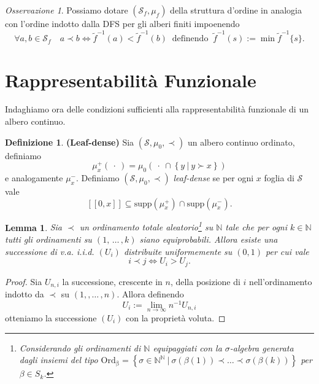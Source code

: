\documentclass[11pt, twoside]{report}
\newcommand{\Ss}{\mathscr{S}}
\theoremstyle{definition}
\newtheorem{definizione}{Definizione}[chapter]
\theoremstyle{plain}
\newtheorem{lemma}[teo]{Lemma}
\theoremstyle{remark}
\newtheorem{oss}{Osservazione}[chapter]
\numberwithin{equation}{chapter}
\begin{document}
\begin{oss}
Possiamo dotare $(\Ss_f, \mu_f)$ della struttura d'ordine in analogia con l'ordine indotto dalla DFS per gli alberi finiti impoenendo 
$$\forall a,b\in \Ss_f \quad a\prec b \iff \tilde{f}^{-1}(a)<\tilde{f}^{-1}(b) \ \text{ definendo } \ \tilde{f}^{-1}(s):=\min \tilde{f}^{-1}\{s\}.$$
\end{oss}

\section{Rappresentabilità Funzionale}

Indaghiamo ora delle condizioni sufficienti alla rappresentabilità funzionale di un albero continuo.

\begin{definizione}{\textbf{(Leaf-dense)}}
Sia $(\Ss, \mu_0, \prec)$ un albero continuo ordinato, definiamo
$$\mu_x^+(\ \cdot\ )=\mu_0\left(\ \cdot \ \cap \left\{y \ | \ y\succ x\right\}\right)$$
e analogamente $\mu_x^-$. Definiamo $(\Ss, \mu_0, \prec)$ \textit{leaf-dense} se per ogni $x$ foglia di $\Ss$ vale
$$[[0,x]] \subseteq \mathrm{supp}\left(\mu_x^+\right) \cap \mathrm{supp} \left(\mu_x^-\right).$$
\end{definizione}

\begin{lemma}\label{lemma_order}
Sia $\prec$ un ordinamento totale aleatorio\footnote{Considerando gli ordinamenti di $\mathbb{N}$ equipaggiati con la $\sigma$-algebra generata dagli insiemi del tipo ${\mathrm{Ord_{\beta}}=\left\{ \sigma \in \mathbb{N}^{\mathbb{N}} \ \big| \ \sigma(\beta(1)) \prec \dots \prec \sigma(\beta(k))\right\}}$ per $\beta\in S_k$.} su $\mathbb{N}$ tale che per ogni $k\in \mathbb{N}$ tutti gli ordinamenti su 
$\left(1, \, \dots \, ,k\right)$ siano equiprobabili. Allora esiste una successione di v.a. i.i.d. $\left(U_i\right)$ distribuite uniformemente su $(0,1)$ per cui vale
$$i\prec j \iff U_i>U_j.$$
\end{lemma}

\begin{proof}
Sia $U_{n,i}$ la successione, crescente in $n$, della posizione di $i$ nell'ordinamento indotto da $\prec$ su $(1, 	, \dots \, ,n)$. Allora definendo
$$U_i:=\lim\limits_{n\to\infty} n^{-1}U_{n,i}$$
otteniamo la successione $(U_i)$ con la proprietà voluta.
\end{proof}
\end{document}
